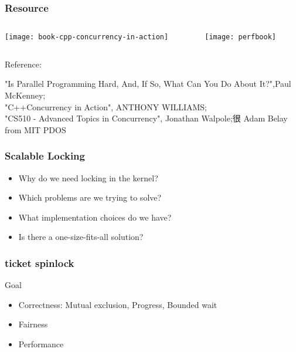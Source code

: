 \begin{frame}
    \frametitle{Resource}
    
    
    

	\begin{columns}
    
    \begin{column}{.5\textwidth}
        \centering
        
        \texttt{[image: book-cpp-concurrency-in-action]}
        
    \end{column}
    
    \begin{column}{.5\textwidth}
        
      \texttt{[image: perfbook]}
       
        
    \end{column}
    
    
\end{columns}
    
    \tiny Reference:
    
    "Is Parallel Programming Hard, And, If So, What Can You Do About It?",Paul McKenney;\\
    "C++Concurrency in Action", ANTHONY WILLIAMS; \\
    "CS510 - Advanced Topics in Concurrency", Jonathan Walpole;很 
    Adam Belay from MIT PDOS
\end{frame}

\begin{frame}[fragile]
    \frametitle{Scalable Locking}
    \Large
    \begin{itemize}
    \item Why do we need locking in the kernel?
    \item Which problems are we trying to solve?
    \item What implementation choices do we have?
    \item Is there a one-size-fits-all solution?
  
\end{itemize}
    
\end{frame}


\begin{frame}[fragile]
    \frametitle{ticket spinlock}
    \Large
    Goal
    \begin{itemize}
        \item Correctness:  Mutual exclusion, Progress, Bounded wait
        \item  Fairness       
        \item Performance
        
        
    \end{itemize}
    
\end{frame}


